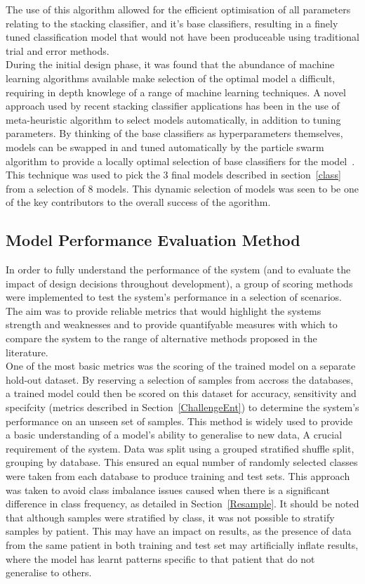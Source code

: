 \documentclass[titlepage, 12pt]{scrartcl} \usepackage{enumitem}
\begin{document}
The use of this algorithm allowed for the efficient optimisation of all parameters
relating to the stacking classifier, and it's base classifiers, resulting in a
finely tuned classification model that would not have been produceable using
traditional trial and error methods.\\
During the initial design phase, it was found that the abundance of machine
learning algorithms available make selection of the optimal model a difficult,
requiring in depth knowlege of a range of machine learning techniques. A novel
approach used by recent stacking classifier applications has been in the use of
meta-heuristic algorithm to select models automatically, in addition to tuning
parameters. By thinking of the base classifiers as hyperparameters themselves,
models can be swapped in and tuned automatically by the particle swarm
algorithm to provide a locally optimal selection of base classifiers for the
model~\parencite{Sesmero2015}. This technique was used to pick the 3 final
models described in section~\ref{class} from a selection of 8 models. This
dynamic selection of models was seen to be one of the key contributors to the
overall success of the agorithm.

\subsection{Model Performance Evaluation Method}\label{metrics}
In order to fully understand the performance of the system (and to evaluate the
impact of design decisions throughout development), a group of scoring methods
were implemented to test the system's performance in a selection of scenarios.
The aim was to provide reliable metrics that would highlight the systems
strength and weaknesses and to provide quantifyable measures with which to
compare the system to the range of alternative methods proposed in the
literature.\\

One of the most basic metrics was the scoring of the trained model on a
separate hold-out dataset. By reserving a selection of samples from accross the
databases, a trained model could then be scored on this dataset for accuracy, sensitivity and
specifcity (metrics described in Section~\ref{ChallengeEnt}) to determine the
system's performance on an unseen set of samples. This method is widely used to
provide a basic understanding of a model's ability to generalise to new data, A
crucial requirement of the system. Data was split using a grouped stratified shuffle
split, grouping by database. This ensured an equal number of randomly selected
classes were taken from each database to produce training and test sets. This
approach was taken to avoid class imbalance issues caused when there is a
significant difference in class frequency, as detailed in
Section~\ref{Resample}. It should be noted that although samples were
stratified by class, it was not possible to stratify samples by patient. This
may have an impact on results, as the presence of data from the same patient in
both training and test set may artificially inflate results, where the model has
learnt patterns specific to that patient that do not generalise to others.\\
\end{document}
